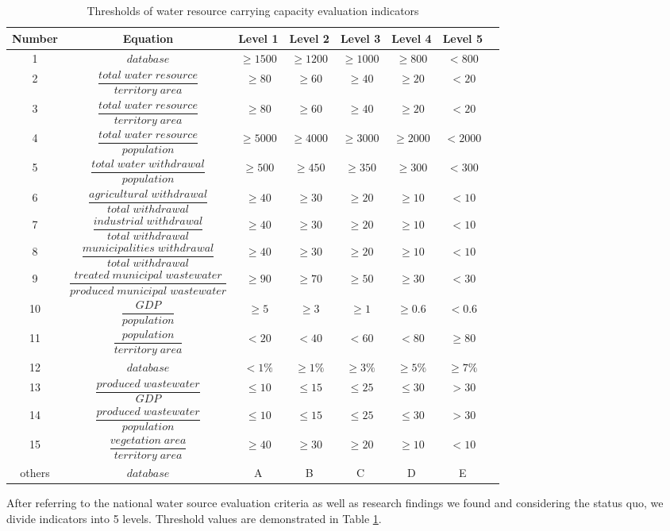 \begin{table} [!htbp]
\centering\caption{Thresholds of water resource carrying capacity evaluation indicators}
\begin{tabular}{|c|c|c|c|c|c|c|c|}
  \hline
  Number & Equation & Level 1 & Level 2 & Level 3 & Level 4 & Level 5 \\
  \hline
  1 & $database$ & $\geq1500$ & $\geq1200$ & $\geq1000$ & $\geq800$ & $<800$ \\
  \hline
  2 & $\dfrac{total\;water\;resource}{territory\;area}$ & $\geq80$ & $\geq60$ & $\geq40$ & $\geq20$ & $<20$ \\
  \hline
  3 & $\dfrac{total\;water\;resource}{territory\;area}$ & $\geq80$ & $\geq60$ & $\geq40$ & $\geq20$ & $<20$ \\
  \hline
  4 & $\dfrac{total\;water\;resource}{population}$ & $\geq5000$ & $\geq4000$ & $\geq3000$ & $\geq2000$ & $<2000$ \\
  \hline
  5 & $\dfrac{total\;water\;withdrawal}{population}$ & $\geq500$ & $\geq450$ & $\geq350$ & $\geq300$ & $<300$ \\
  \hline
  6 & $\dfrac{agricultural\;withdrawal}{total\;withdrawal}$ & $\geq40$ & $\geq30$ & $\geq20$ & $\geq10$ & $<10$ \\
  \hline
  7 & $\dfrac{industrial\;withdrawal}{total\;withdrawal}$ & $\geq40$ & $\geq30$ & $\geq20$ & $\geq10$ & $<10$ \\
  \hline
  8 & $\dfrac{municipalities\;withdrawal}{total\;withdrawal}$ & $\geq40$ & $\geq30$ & $\geq20$ & $\geq10$ & $<10$ \\
  \hline
  9 & $\dfrac{treated\;municipal\;wastewater}{produced\;municipal\;wastewater}$ & $\geq90$ & $\geq70$ & $\geq50$ & $\geq30$ & $<30$ \\
  \hline
  10 & $\dfrac{GDP}{population}$ & $\geq5$ & $\geq3$ & $\geq1$ & $\geq0.6$ & $<0.6$ \\
  \hline
  11 & $\dfrac{population}{territory\;area}$ & $<20$ & $<40$ & $<60$ & $<80$ & $\geq80$ \\
  \hline
  12 & $database$ & $<1\%$ & $\geq1\%$ & $\geq3\%$ & $\geq5\%$ & $\geq7\%$  \\
  \hline
  13 & $\dfrac{produced\;wastewater}{GDP}$ & $\leq10$ & $\leq15$ & $\leq25$ & $\leq30$ & $>30$ \\
  \hline
  14 & $\dfrac{produced\;wastewater}{population}$ & $\leq10$ & $\leq15$ & $\leq25$ & $\leq30$ & $>30$ \\
  \hline
  15 & $\dfrac{vegetation\;area}{territory\;area}$ & $\geq40$ & $\geq30$ & $\geq20$ & $\geq10$ & $<10$ \\
  \hline
  others & $database$ & A & B & C & D & E \\
  \hline
  \end{tabular}\label{criteria}
  \end{table}
After referring to the national water source evaluation criteria as well as research findings we found and considering the status quo, we divide indicators into 5 levels. Threshold values are demonstrated in Table \ref{criteria}.

